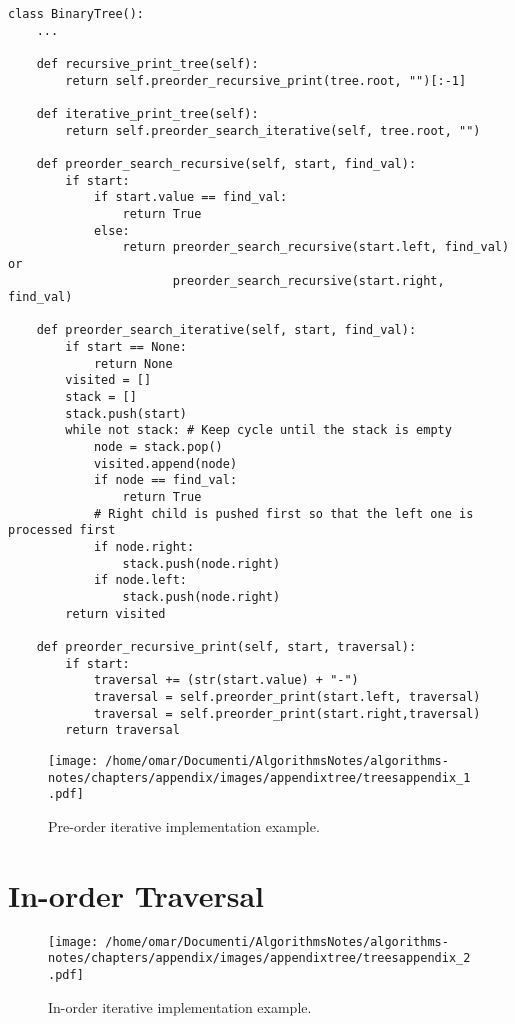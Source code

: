 \begin{lstlisting}[firstnumber=1, caption={Recursive and iterative implementation of pre-order traversal.}]
class BinaryTree():
	...

	def recursive_print_tree(self):
		return self.preorder_recursive_print(tree.root, "")[:-1]
	
	def iterative_print_tree(self):
		return self.preorder_search_iterative(self, tree.root, "")

	def preorder_search_recursive(self, start, find_val):
		if start:
			if start.value == find_val:
				return True
			else:
				return preorder_search_recursive(start.left, find_val) or
					   preorder_search_recursive(start.right, find_val)

	def preorder_search_iterative(self, start, find_val):
		if start == None:
			return None
		visited = []		
		stack = []
		stack.push(start)
		while not stack: # Keep cycle until the stack is empty
			node = stack.pop()
			visited.append(node)
			if node == find_val:
				return True
			# Right child is pushed first so that the left one is processed first
			if node.right:
				stack.push(node.right)
			if node.left:
				stack.push(node.right)
		return visited

	def preorder_recursive_print(self, start, traversal):
		if start:
			traversal += (str(start.value) + "-")
			traversal = self.preorder_print(start.left, traversal)
			traversal = self.preorder_print(start.right,traversal)
		return traversal
\end{lstlisting}

\begin{figure}[H]
	\begin{center}
		\texttt{[image: /home/omar/Documenti/AlgorithmsNotes/algorithms-notes/chapters/appendix/images/appendixtree/treesappendix\_1.pdf]}
		\caption[Pre-order iterative implementation example.]{Pre-order iterative implementation example.}
		\label{appendixtrees_1}
	\end{center}
\end{figure}

\section{In-order Traversal}
\label{inorderappendix}
\begin{figure}[H]
	\begin{center}
		\texttt{[image: /home/omar/Documenti/AlgorithmsNotes/algorithms-notes/chapters/appendix/images/appendixtree/treesappendix\_2.pdf]}
		\caption[In-order iterative implementation example.]{In-order iterative implementation example.}
		\label{appendixtrees_2}
	\end{center}
\end{figure}

